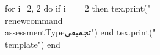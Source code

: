 \documentclass[twoside, 10pt]{article}
\title{}
\date{}
\newcommand{\assessmentType}{تجميعي}
\newcommand{\template}{
\begin{Arabic}
\noindent
{\large
الاسم الأول \rule{6em}{.4pt}\hspace{\stretch{1}} اسم العائلة \rule{6em}{.4pt}\hspace{\stretch{1}} التاريخ \raisebox{0.3em}{\underline{\quad\today\quad} \hspace{\stretch{1}}} الحصة \rule{2em}{.4pt}\hspace{\stretch{1}}
}
\vspace{1em}

\noindent
\renewcommand{\arraystretch}{2}
\begin{tabular}{|l|l|l|}
\hline
\textbf{قدم الحجج}&\textbf{النمذجة}&\textbf{كن دقيقاً}\\
\hline
&&\\
\hline
\end{tabular}

\vspace{1em}
\noindent
\textbf{الأدوات:} آلة حاسبة علمية
\vspace{1em}

\begin{enumerate}[leftmargin=*, itemsep=1.2em]
\item \textbf{كن دقيقاً}:
\begin{enumerate}[leftmargin=*, itemsep=1.5em]
\item
حدد الدرجة والمعامل الرئيسي والحد الثابت لكثيرة الحدود التالية:
\[\directlua{tex.print(utils.genRandom(-10,10, false, true, true))} x^{\directlua{tex.print(utils.genRandom(1,10,false, true,true))}}\directlua{tex.print(utils.genRandom(-10,10, true, true, true))} x^{\directlua{tex.print(utils.genRandom(11,20,false, true,true))}}\directlua{tex.print(utils.genRandom(-10,10, true, true, true))} x^{\directlua{tex.print(utils.genRandom(1,10,false, true,true))}}\directlua{tex.print(utils.genRandom(-200,200, true, false, true))} \]

\vspace{1em}
الدرجة: \rule{5em}{0.4pt}\hspace{\stretch{1}} المعامل الرئيسي: \rule{5em}{0.4pt}\hspace{\stretch{1}} الحد الثابت: \rule{5em}{0.4pt}\hspace{\stretch{1}}
 
\item النقطه المحددة بالإحداثيات $(a,b)$ تقع على الرسم البياني للدالة $f(x)$ إذا \hrulefill.
\item إذا كانت $x_0$ هي نقطة التقاطع مع المحور $x$ للدالة $f(x)$، فإن \hrulefill.
\item إذا كانت $y_0$ هي نقطة التقاطع مع المحور $y$ للدالة $f(x)$، فإن \hrulefill
 
\item لتكن الدالتان $f(x) = \directlua{tex.print(d2)}x^2 \directlua{tex.print(a2)}x + 4$ و $g(x) = 2x \directlua{tex.print(d4)}$، احسب $f(x) - g(x)$ وعبر عن النتيجة بالصورة القياسية. استخدم المساحة أدناه للحسابات اللازمة.
\vspace{\stretch{1}}
\end{enumerate}
\clearpage
\item\footnote{معدلة من مسألة اختيارية بقيمة 6 نقاط في اختبار \textenglish{Algebra II Regents} لشهر يناير 2024. وهي سهلة للغاية ويمكن التعامل معها ببرود!} (\textbf{النمذجة}) يجد مصنع للسترات الصوفية أن الأرباح والتكاليف تتذبذب اعتماداً على عدد المنتجات المصنعة. لا تؤدي زيادة الإنتاج دائماً إلى زيادة الأرباح لأنها تتطلب تكاليف إضافية، مثل بناء منشأة أكبر أو توظيف المزيد من العمال. يحدد المصنع الربح، $p(x)$، بـ \textbf{آلاف الدولارات}، كدالة لعدد السترات المباعة، $x$، بـ \textbf{الآلاف}. هذه الدالة، $p$، معطاة أدناه.
\[
p(x) = -x^3 + 11x^2-7x-69
\]
الرسم البياني لـ $y=p(x)$، على الفترة $0\leq x \leq 15$، موضح على المحاور أدناه. كما يتم توفير جزء من جدول الدالة $y = p(x)$ أدناه.
\begin{center}
\begin{minipage}[t]{0.7\textwidth}
\vspace{0pt}
\centering
\begin{tikzpicture}
\begin{axis}[
    width=\textwidth,
    axis lines=middle,
    xmin=-6, xmax=15,
    ymin=-105, ymax=195,
    minor y tick num=19,
    minor x tick num=19,
    grid=both,
    xtick distance=20,
    ytick distance=300,
    xlabel={$x$},
    ylabel={$y$},
    samples=200,
    clip=true,
    extra x ticks={1},
    extra y ticks={30},
]
\addplot[domain=0:15, thick]
    {-x^3+11*x^2-7*x-69}
    node[pos=0.85, above right] {$y=p(x)$};
\end{axis}
\end{tikzpicture}
\end{minipage}%
\hfill
\begin{minipage}[t]{0.25\textwidth}
\vspace{0pt}
\centering
\directlua{
    tex.print("\\begin{tabular}{|c|c|}\\hline x&y \\\\\\hline");
    for i=3545,3555 do
        x = i/1000;
        y = -x^3+11*x^2-7*x-69;
        y = math.floor(y*1000+0.5)/1000;
        tex.print(x.."&"..y.."\\\\\\hline");
    end;
    tex.print("\\end{tabular}")
}
\end{minipage}
\end{center}
\begin{enumerate}
\item كيف تحدد نافذة الرسم البياني في الحاسبة وفقاً لهذه المحاور؟
\begin{center}
\renewcommand{\arraystretch}{1.6}
\newcommand{\cellwidth}{5.5em}
\begin{tabular}{|c|c|c|c|c|c|}
\hline
XMIN & XMAX & XSCL & YMIN & YMAX & YSCL \\
\hline
\rule{0pt}{2em}\hspace{\cellwidth} & \hspace{\cellwidth} & \hspace{\cellwidth} & \hspace{\cellwidth} & \hspace{\cellwidth} & \hspace{\cellwidth} \\
\hline
\end{tabular}
\end{center}
 
\item عبر الفترة المعطاة، اذكر إحداثيات القيمة العظمى للدالة $p$ وقرّب جميع القيم إلى أقرب عدد صحيح. وضح ما تمثله هذه النقطة من حيث عدد السترات المباعة والربح.
\vspace{\stretch{1}}
\item حدد عدد السترات، لأقرب سترة كاملة، التي يحتاج المصنع إلى إنتاجها من أجل تحقيق ربح إيجابي لأول مرة. برر إجابتك.
\vspace{\stretch{1}}
\end{enumerate}

\end{enumerate}
\end{Arabic}
}
\begin{document}
\begin{luacode*}
for i=2, 2 do
	if i == 2 then
		tex.print("\\renewcommand{\\assessmentType}{تجميعي}")
	end
	tex.print("\\template")
end
\end{luacode*}
\end{document}
